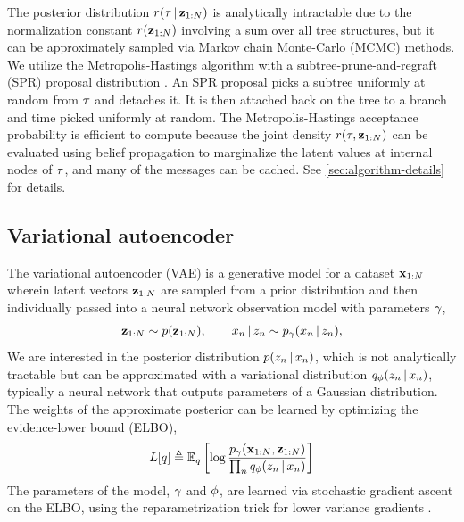 The posterior distribution $r(\tau \,|\, \mathbf{z}_{1:N})$
is analytically intractable due to the normalization constant
$r(\mathbf{z}_{1:N})$ involving a sum over all tree structures,
but it can be approximately sampled via Markov chain Monte-Carlo (MCMC) methods.
We utilize the Metropolis-Hastings
algorithm with a subtree-prune-and-regraft (SPR)
proposal distribution \citep{Neal2003}. An SPR proposal
picks a subtree uniformly at random from $\tau$
and detaches it.
It is then attached back on the tree
to a branch and time picked uniformly at random.
The Metropolis-Hastings acceptance probability is efficient to compute because the joint density $r(\tau, \mathbf{z}_{1:N})$ can be evaluated using belief propagation to marginalize the latent values at internal nodes of $\tau$, and many of the messages can be cached.
See \autoref{sec:algorithm-details} for details.

\subsection{Variational autoencoder}
The variational autoencoder (VAE) is a generative model
for a dataset $\mathbf{x}_{1:N}$
wherein latent vectors $\mathbf{z}_{1:N}$ are sampled
from a prior distribution
and then individually passed into
a neural network observation model with parameters $\gamma$,
\begin{equation}
    \begin{split}
        \mathbf{z}_{1:N} \sim p(\mathbf{z}_{1:N}),
        \qquad
        x_n \,|\, z_n \sim p_\gamma(x_n \,|\, z_n),
    \end{split}
\end{equation}
We are interested in the posterior distribution
$p(z_n \,|\, x_n)$, which is not analytically tractable
but can be approximated with a variational distribution
$q_\phi(z_n \,|\, x_n)$, typically a neural network
that outputs parameters of a Gaussian distribution.
The weights of the approximate posterior can be learned
by optimizing the evidence-lower bound (ELBO),
\begin{equation}
    \begin{split}
    L[q] &\triangleq \mathbb{E}_q \left[\log \frac{p_\gamma(\mathbf{x}_{1:N}, \mathbf{z}_{1:N})}{\prod_n q_\phi(z_n \,|\, x_n)}\right] \\
    \end{split}
\end{equation}
The parameters of the model, $\gamma$ and $\phi$,
are learned via stochastic gradient ascent on
the ELBO, using the reparametrization trick
for lower variance gradients \citep{Kingma2013, Rezende2014}.

